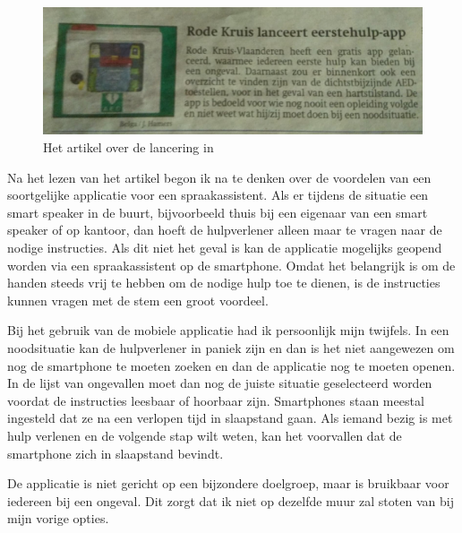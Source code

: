 \begin{figure}[h]
    \includegraphics[width=0.8\linewidth]{img/artikelRodeKruisApp}
    \caption{Het artikel over de lancering in \autocite{Hamers2019}}
    \label{fig:artikel-ehboapp}
\end{figure}

Na het lezen van het artikel begon ik na te denken over de voordelen van een soortgelijke applicatie voor een spraakassistent. Als er tijdens de situatie een smart speaker in de buurt, bijvoorbeeld thuis bij een eigenaar van een smart speaker of op kantoor, dan hoeft de hulpverlener alleen maar te vragen naar de nodige instructies. Als dit niet het geval is kan de applicatie mogelijks geopend worden via een spraakassistent op de smartphone. Omdat het belangrijk is om de handen steeds vrij te hebben om de nodige hulp toe te dienen, is de instructies kunnen vragen met de stem een groot voordeel.

Bij het gebruik van de mobiele applicatie had ik persoonlijk mijn twijfels. In een noodsituatie kan de hulpverlener in paniek zijn en dan is het niet aangewezen om nog de smartphone te moeten zoeken en dan de applicatie nog te moeten openen. In de lijst van ongevallen moet dan nog de juiste situatie geselecteerd worden voordat de instructies leesbaar of hoorbaar zijn. Smartphones staan meestal ingesteld dat ze na een verlopen tijd in slaapstand gaan. Als iemand bezig is met hulp verlenen en de volgende stap wilt weten, kan het voorvallen dat de smartphone zich in slaapstand bevindt.

De applicatie is niet gericht op een bijzondere doelgroep, maar is bruikbaar voor iedereen bij een ongeval. Dit zorgt dat ik niet op dezelfde muur zal stoten van bij mijn vorige opties.